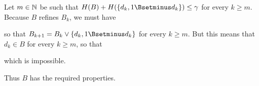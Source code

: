 {
     
\noindent Let $m\in\Bbb N$ be such that $H(B)+H(\{d_k,1\Bsetminus
d_k\})\le\gamma$ for every $k\ge m$.   Because $B$ refines $B_k$, we
must
have
     
     
\noindent so that $B_{k+1}=B_k\vee\{d_k,1\Bsetminus d_k\}$ for every
$k\ge m$.   But this means that $d_k\in B$ for every $k\ge m$, so that
     
     
\noindent which is impossible.\ \Bang\Qed
     
Thus $B$ has the required properties.
}%
     
